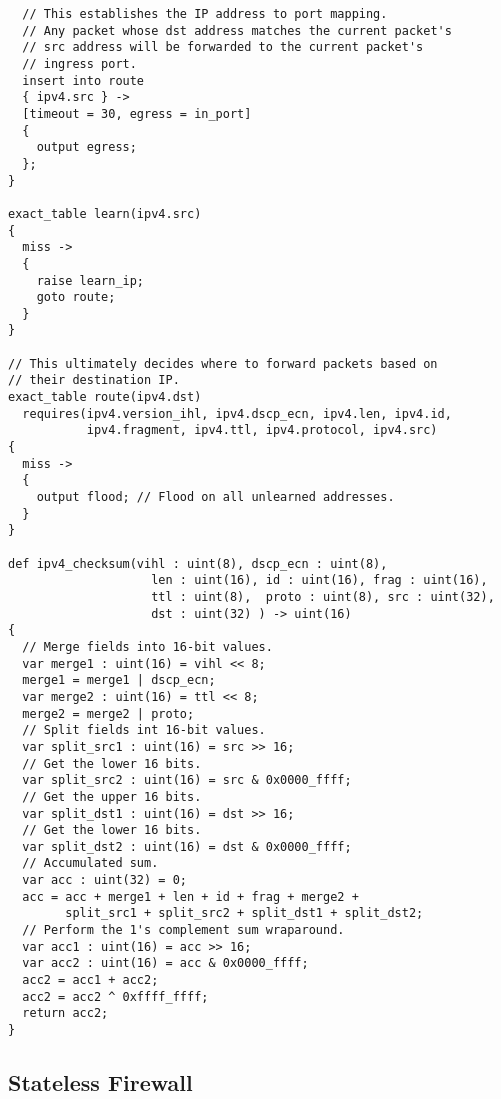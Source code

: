 \begin{lstlisting}
  // This establishes the IP address to port mapping.
  // Any packet whose dst address matches the current packet's
  // src address will be forwarded to the current packet's
  // ingress port.
  insert into route
  { ipv4.src } ->
  [timeout = 30, egress = in_port]
  {
    output egress;
  };
}

exact_table learn(ipv4.src)
{
  miss ->
  {
    raise learn_ip;
    goto route;
  }
}

// This ultimately decides where to forward packets based on
// their destination IP.
exact_table route(ipv4.dst)
  requires(ipv4.version_ihl, ipv4.dscp_ecn, ipv4.len, ipv4.id,
           ipv4.fragment, ipv4.ttl, ipv4.protocol, ipv4.src)
{
  miss ->
  {
    output flood; // Flood on all unlearned addresses.
  }
}

def ipv4_checksum(vihl : uint(8), dscp_ecn : uint(8), 
					len : uint(16),	id : uint(16), frag : uint(16), 
					ttl : uint(8),  proto : uint(8), src : uint(32), 
					dst : uint(32) ) -> uint(16)
{
  // Merge fields into 16-bit values.
  var merge1 : uint(16) = vihl << 8;
  merge1 = merge1 | dscp_ecn;
  var merge2 : uint(16) = ttl << 8;
  merge2 = merge2 | proto;
  // Split fields int 16-bit values.
  var split_src1 : uint(16) = src >> 16;
  // Get the lower 16 bits.
  var split_src2 : uint(16) = src & 0x0000_ffff;
  // Get the upper 16 bits.
  var split_dst1 : uint(16) = dst >> 16;
  // Get the lower 16 bits.
  var split_dst2 : uint(16) = dst & 0x0000_ffff;
  // Accumulated sum.
  var acc : uint(32) = 0;
  acc = acc + merge1 + len + id + frag + merge2 +
        split_src1 + split_src2 + split_dst1 + split_dst2;
  // Perform the 1's complement sum wraparound.
  var acc1 : uint(16) = acc >> 16;
  var acc2 : uint(16) = acc & 0x0000_ffff;
  acc2 = acc1 + acc2;
  acc2 = acc2 ^ 0xffff_ffff;
  return acc2;
}
\end{lstlisting}

\subsection{Stateless Firewall}

